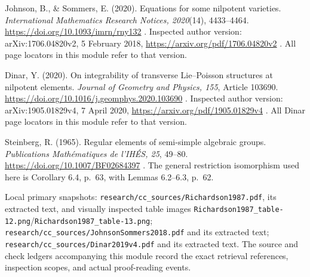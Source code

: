 Johnson, B., \& Sommers, E. (2020). Equations for some nilpotent varieties. \emph{International Mathematics Research Notices, 2020}(14), 4433--4464. \url{https://doi.org/10.1093/imrn/rny132} . Inspected author version: arXiv:1706.04820v2, 5 February 2018, \url{https://arxiv.org/pdf/1706.04820v2} . All page locators in this module refer to that version.

Dinar, Y. (2020). On integrability of transverse Lie--Poisson structures at nilpotent elements. \emph{Journal of Geometry and Physics, 155}, Article 103690. \url{https://doi.org/10.1016/j.geomphys.2020.103690} . Inspected author version: arXiv:1905.01829v4, 7 April 2020, \url{https://arxiv.org/pdf/1905.01829v4} . All Dinar page locators in this module refer to that version.

Steinberg, R. (1965). Regular elements of semi-simple algebraic groups. \emph{Publications Mathématiques de l'IHÉS, 25}, 49--80. \url{https://doi.org/10.1007/BF02684397} . The general restriction isomorphism used here is Corollary 6.4, p.~63, with Lemmas 6.2--6.3, p.~62.

Local primary snapshots: \texttt{research/cc\_sources/Richardson1987.pdf}, its extracted text, and visually inspected table images \texttt{Richardson1987\_table-12.png}/\texttt{Richardson1987\_table-13.png}; \texttt{research/cc\_sources/JohnsonSommers2018.pdf} and its extracted text; \texttt{research/cc\_sources/Dinar2019v4.pdf} and its extracted text. The source and check ledgers accompanying this module record the exact retrieval references, inspection scopes, and actual proof-reading events.
